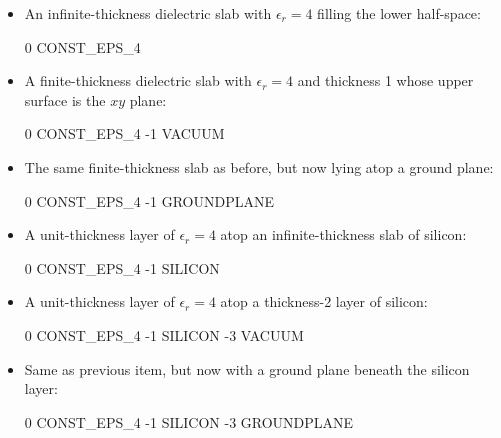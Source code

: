 \documentclass[letterpaper]{article}
\begin{document}
\begin{itemize}

\item An infinite-thickness dielectric slab with $\epsilon_r=4$ filling
the lower half-space:

\medskip
\begin{verbcode}
0 CONST_EPS_4
\end{verbcode}
\medskip

\item A finite-thickness dielectric slab with $\epsilon_r=4$
and thickness 1 whose upper surface is the $xy$ plane:

\medskip
\begin{verbcode}
 0 CONST_EPS_4
-1 VACUUM
\end{verbcode}

\item The same finite-thickness slab as before, but now 
lying atop a ground plane:

\medskip
\begin{verbcode}
 0 CONST_EPS_4
-1 GROUNDPLANE
\end{verbcode}
\medskip

\item A unit-thickness layer of $\epsilon_r=4$ atop an infinite-thickness
slab of silicon:

\medskip
\begin{verbcode}
 0 CONST_EPS_4
-1 SILICON
\end{verbcode}

\item A unit-thickness layer of $\epsilon_r=4$ atop a thickness-2 layer 
of silicon:

\medskip
\begin{verbcode}
 0 CONST_EPS_4
-1 SILICON
-3 VACUUM
\end{verbcode}

\item Same as previous item, but now with a ground plane beneath
the silicon layer:

\medskip
\begin{verbcode}
 0 CONST_EPS_4
-1 SILICON
-3 GROUNDPLANE
\end{verbcode}
\medskip
\end{itemize}
\end{document}

